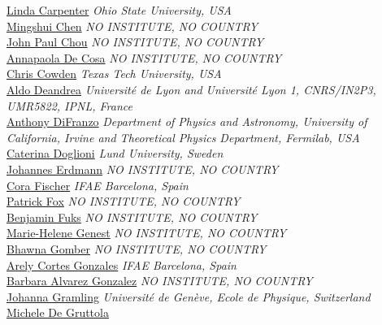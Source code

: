 \noindent\href{mailto:lmc@physics.osu.edu}{Linda Carpenter} 
\emph{Ohio State University, USA}\\
\noindent\href{mailto:Mingshui.Chen@cern.ch}{Mingshui Chen} 
\emph{NO INSTITUTE, NO COUNTRY}\\
\noindent\href{mailto:john.paul.chou@cern.ch}{John Paul Chou} 
\emph{NO INSTITUTE, NO COUNTRY}\\
\noindent\href{mailto:annapaola.de.cosa@cern.ch}{Annapaola De Cosa} 
\emph{NO INSTITUTE, NO COUNTRY}\\
\noindent\href{mailto:christopher.cowden@cern.ch}{Chris Cowden} 
\emph{Texas Tech University, USA}\\
\noindent\href{mailto:deandrea@ipnl.in2p3.fr}{Aldo Deandrea} 
\emph{Universit\'e de Lyon and Universit\'e Lyon 1, CNRS/IN2P3, UMR5822, IPNL, France}\\
\noindent\href{mailto:adifranz@uci.edu}{Anthony DiFranzo} 
\emph{Department of Physics and Astronomy, University of California, Irvine and Theoretical Physics Department, Fermilab, USA}\\
\noindent\href{mailto:caterina.doglioni@cern.ch}{Caterina Doglioni} 
\emph{Lund University, Sweden}\\
\noindent\href{mailto:Johannes.Erdmann@cern.ch}{Johannes Erdmann} 
\emph{NO INSTITUTE, NO COUNTRY}\\
\noindent\href{mailto:cfischer@ifae.es}{Cora Fischer} 
\emph{IFAE Barcelona, Spain}\\
\noindent\href{mailto:pjfox@fnal.gov}{Patrick Fox} 
\emph{NO INSTITUTE, NO COUNTRY}\\
\noindent\href{mailto:Benjamin.Fuks@cern.ch}{Benjamin Fuks} 
\emph{NO INSTITUTE, NO COUNTRY}\\
\noindent\href{mailto:genest@lpsc.in2p3.fr}{Marie-Helene Genest} 
\emph{NO INSTITUTE, NO COUNTRY}\\
\noindent\href{mailto:Bhawna.Gomber@cern.ch}{Bhawna Gomber} 
\emph{NO INSTITUTE, NO COUNTRY}\\
\noindent\href{mailto:arely.cortes.gonzalez@cern.ch}{Arely Cortes Gonzales} 
\emph{IFAE Barcelona, Spain}\\
\noindent\href{mailto:barbara.alvarez.gonzalez@cern.ch}{Barbara Alvarez Gonzalez} 
\emph{NO INSTITUTE, NO COUNTRY}\\
\noindent\href{mailto:johanna.gramling@cern.ch}{Johanna Gramling} 
\emph{Universit\'e de Gen\`eve, Ecole de Physique, Switzerland}\\
\noindent\href{mailto:michele.degruttola@cern.ch}{Michele De Gruttola} 

